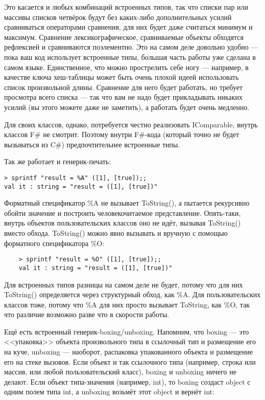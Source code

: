 \documentclass[a5paper]{article}
\begin{document}
Это касается и любых комбинаций встроенных типов, так что списки пар или массивы списков четвёрок будут без каких-либо дополнительных усилий сравниваться операторами сравнения, для них будет даже считаться минимум и максимум. Сравнение лексикографическое, сравниваемые объекты обходятся рефлексией и сравниваются поэлементно. Это на самом деле довольно удобно --- пока ваш код использует встроенные типы, большая часть работы уже сделана в самом языке. Единственное, что можно прострелить себе ногу --- например, в качестве ключа хеш-таблицы может быть очень плохой идеей использовать список произвольной длины. Сравнение для него будет работать, но требует просмотра всего списка --- так что вам не надо будет прикладывать никаких усилий (вы этого можете даже не заметить), а работать будет очень медленно. 

Для своих классов, однако, потребуется честно реализовать IComparable, внутрь классов F\# не смотрит. Поэтому внутри F\#-кода (который точно не будет вызываться из C\#) предпочтительнее встроенные типы.

Так же работает и генерик-печать:

\begin{verbatim}
> sprintf "result = %A" ([1], [true]);;
val it : string = "result = ([1], [true])"
\end{verbatim}

Форматный спецификатор \%A не вызывает ToString(), а пытается рекурсивно обойти значение и построить человекочитаемое представление. Опять-таки, внутрь объектов пользовательских классов оно не идёт, вызывая ToString() вместо обхода. ToString() можно явно вызывать и вручную с помощью форматного спецификатора \%O:

\begin{verbatim}
    > sprintf "result = %O" ([1], [true]);;
    val it : string = "result = ([1], [true])"
\end{verbatim}

Для встроенных типов разницы на самом деле не будет, потому что для них ToString() определяется через структурный обход, как \%A. Для пользовательских классов тоже, потому что \%A для них просто вызывает ToString, как \%O, так что различие возможно разве что в скорости работы.

Ещё есть встроенный генерик-boxing/unboxing. Напомним, что boxing --- это <<упаковка>> объекта произвольного типа в ссылочный тип и размещение его на куче, unboxing --- наоборот, распаковка упакованного объекта и размещение его на стеке вызовов. Если объект и так ссылочного типа (например, строка или массив, или любой пользовательский класс), boxing и unboxing ничего не делают. Если объект типа-значения (например, int), то boxing создаст object с одним полем типа int, а unboxing возьмёт этот object и вернёт int: 
\end{document}
